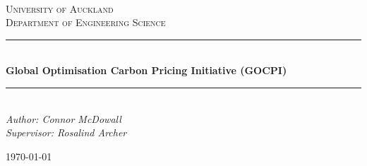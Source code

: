 \documentclass[12pt]{article}
\begin{document}
\begin{titlepage}
	\newcommand{\HRule}{\rule{\linewidth}{0.5mm}} %
	
	\center
	
	
	\textsc{\LARGE }\\[1.5cm] %
	
	\textsc{\Large University of Auckland\\Department of Engineering Science}\\[0.5cm] %
	
	
	\HRule\\[0.5cm]
	
	{\huge\bfseries Global Optimisation Carbon Pricing Initiative (GOCPI)}\\[0.4cm] %
	
	\HRule\\[0.5cm]
	
	
	{\large\textit{Author: Connor McDowall \\Supervisor: Rosalind Archer}}\\
	
	
	\vfill\vfill\vfill %
	
	{\large\today} %
	 
	
	\vfill %
	
\end{titlepage}
\newpage
\end{document}
